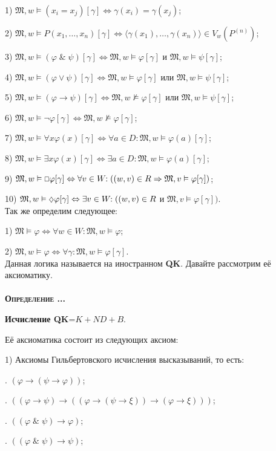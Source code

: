 \documentclass[18pt, a4paper]{extarticle}
\newcounter{par}
\newcounter{spar}
\newcounter{zap}
\newcommand{\opr}{\textbf{\textsc{Определение \thepar.\if\thespar1\thespar.\fi\thezap.\;}}\stepcounter{zap}}
\newcommand{\mM}{\mathfrak{M}}
\newcommand{\ampersand}{\;\&\;}
\newcommand{\vp}{\varphi}
\newcommand{\vD}{\vDash}
\newcommand{\lot}[3]{#1_#2,\dots,#1_#3}
\newcommand{\may}{\scalebox{0.8}{$\diamondsuit$}}
\newcommand{\need}{\scalebox{0.75}{$\Box$}}
\begin{document}
1) $\mM,w\vD(x_i=x_j)[\gamma]\Leftrightarrow\gamma(x_i)=\gamma(x_j)$;

2) $\mM,w\vD P(\lot x 1 n)[\gamma]\Leftrightarrow\langle\gamma(x_1),\dots,\gamma(x_n)\rangle\in V_w(P^{(n)})$;

3) $\mM,w\vD(\vp\ampersand\psi)[\gamma]\Leftrightarrow\mM,w\vD\vp[\gamma]$ и $\mM,w\vD\psi[\gamma]$;

4) $\mM,w\vD(\vp\vee\psi)[\gamma]\Leftrightarrow\mM,w\vD\vp[\gamma]$ или $\mM,w\vD\psi[\gamma]$;

5) $\mM,w\vD(\vp\to\psi)[\gamma]\Leftrightarrow\mM,w\nvDash\vp[\gamma]$ или $\mM,w\vD\psi[\gamma]$;

6) $\mM,w\vD\lnot\vp[\gamma]\Leftrightarrow\mM,w\nvDash\vp[\gamma]$;

7) $\mM,w\vD\forall x\vp(x)[\gamma]\Leftrightarrow\forall a\in D\!:\mM,w\vD\vp(a)[\gamma]$;

8) $\mM,w\vD\exists x\vp(x)[\gamma]\Leftrightarrow\exists a\in D\!:\mM,w\vD\vp(a)[\gamma]$;

9) $\mM,w\vD\need\vp[\gamma]\Leftrightarrow\forall v\in W\!\!:((w,v)\in R\Rightarrow\mM,v\vD\vp[\gamma])$;

10) $\mM,w\vD\may\vp[\gamma]\Leftrightarrow\exists v\in W\!\!:((w,v)\in R$ и $\mM,v\vD\vp[\gamma])$.\\

Так же определим следующее:

1) $\mM\vD\vp\Leftrightarrow\forall w\in W\!\!:\mM,w\vD\vp$;

2) $\mM,w\vD\vp\Leftrightarrow\forall \gamma\!:\mM,w\vD\vp[\gamma]$.\\

Данная логика называется на иностранном \textbf{QK}. Давайте рассмотрим её аксиоматику.\\\\

\opr

\textbf{Исчисление QK}=$K+N\!D+B$. 

Её аксиоматика состоит из следующих аксиом:

1) Аксиомы Гильбертовского исчисления высказываний, то есть:

. $(\varphi\to(\psi\to\varphi))$;

. $((\varphi\to\psi)\to((\varphi\to(\psi\to\xi))\to(\vp\to\xi)))$;

. $((\varphi\ampersand\psi)\to\varphi)$;

. $((\varphi\ampersand\psi)\to\psi)$;
\end{document}
